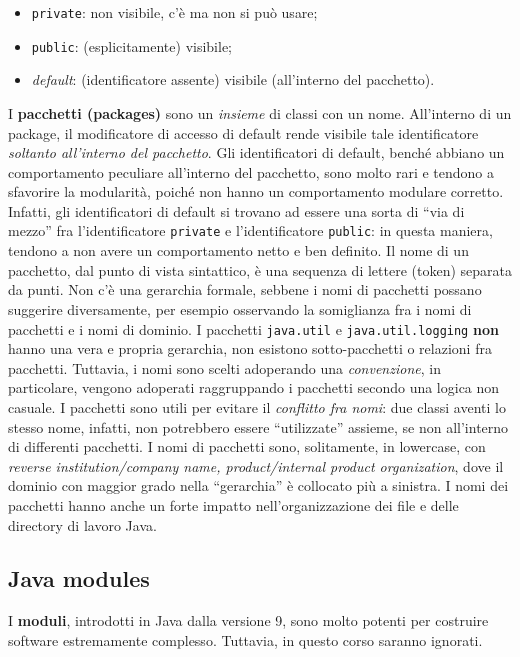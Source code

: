 \documentclass[\fontsizeclass,twocolumn]{\classname}
\theoremstyle{definition}
\theoremstyle{definition}
\begin{document}
\begin{itemize}
    \item \texttt{private}: non visibile, c'è ma non si può usare;
    \item \texttt{public}: (esplicitamente) visibile;
    \item \emph{default}: (identificatore assente) visibile (all'interno del
        pacchetto).
\end{itemize}

I \textbf{pacchetti (packages)} sono un \emph{insieme} di classi con un nome. All'interno di un package, il modificatore di accesso di default rende visibile tale identificatore \emph{soltanto all'interno del pacchetto}. Gli identificatori di default, benché abbiano un comportamento peculiare all'interno del pacchetto, sono molto rari e tendono a sfavorire la modularità, poiché non hanno un comportamento modulare corretto. Infatti, gli identificatori di default si trovano ad essere una sorta di ``via di mezzo'' fra l'identificatore \texttt{private} e l'identificatore \texttt{public}: in questa maniera, tendono a non avere un comportamento netto e ben definito. Il nome di un pacchetto, dal punto di vista sintattico, è una sequenza di lettere (token) separata da punti. Non c'è una gerarchia formale, sebbene i nomi di pacchetti possano suggerire diversamente, per esempio osservando la somiglianza fra i nomi di pacchetti e i nomi di dominio. I pacchetti \texttt{java.util} e \texttt{java.util.logging} \textbf{non} hanno una vera e propria gerarchia, non esistono sotto-pacchetti o relazioni fra pacchetti. Tuttavia, i nomi sono scelti adoperando una \emph{convenzione}, in particolare, vengono adoperati raggruppando i pacchetti secondo una logica non casuale. I pacchetti sono utili per evitare il \emph{conflitto fra nomi}: due classi aventi lo stesso nome, infatti, non potrebbero essere ``utilizzate'' assieme, se non all'interno di differenti pacchetti. I nomi di pacchetti sono, solitamente, in lowercase, con \emph{reverse institution/company name, product/internal product organization}, dove il dominio con maggior grado nella ``gerarchia'' è collocato più a sinistra. I nomi dei pacchetti hanno anche un forte impatto nell'organizzazione dei file e delle directory di lavoro Java.

\subsection{Java modules}

I \textbf{moduli}, introdotti in Java dalla versione 9, sono molto potenti per costruire software estremamente complesso. Tuttavia, in questo corso saranno ignorati.
\end{document}
